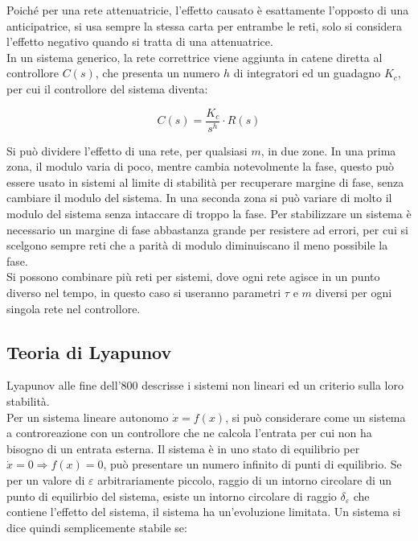 \documentclass{article}
\numberwithin{equation}{subsection}
\begin{document}
Poiché per una rete attenuatricie, l'effetto causato è esattamente l'opposto di una anticipatrice, si usa sempre la stessa carta per entrambe le reti, solo si considera 
l'effetto negativo quando si tratta di una attenuatrice. \\

In un sistema generico, la rete correttrice viene aggiunta in catene diretta al controllore $C(s)$, che presenta un numero $h$ di integratori ed un guadagno $K_c$, per cui 
il controllore del sistema diventa: 

\begin{equation}
    C(s)=\displaystyle\frac{K_c}{s^h}\cdot R(s)
\end{equation}

Si può dividere l'effetto di una rete, per qualsiasi $m$, in due zone. In una prima zona, il modulo varia di poco, mentre cambia notevolmente la fase, questo può essere 
usato in sistemi al limite di stabilità per recuperare margine di fase, senza cambiare il modulo del sistema. In una seconda zona si può variare di molto il modulo del 
sistema senza intaccare di troppo la fase. Per stabilizzare un sistema è necessario un margine di fase abbastanza grande per resistere ad errori, per cui si scelgono sempre 
reti che a parità di modulo diminuiscano il meno possibile la fase. \\


Si possono combinare più reti per sistemi, dove ogni rete agisce in un punto diverso nel tempo, in questo caso si useranno parametri $\tau$ e $m$ diversi per ogni singola 
rete nel controllore. 






\subsection{Teoria di Lyapunov}

Lyapunov alle fine dell'$800$ descrisse i sistemi non lineari ed un criterio sulla loro stabilità. \\

Per un sistema lineare autonomo $\dot x=f(x)$, si può considerare come un 
sistema a controreazione con un controllore che ne calcola l'entrata per cui non ha bisogno di un entrata esterna. Il sistema è in uno stato di equilibrio per 
$\dot x=0\Rightarrow f(x)=0$, può presentare un numero infinito di punti di equilibrio. Se per un valore di $\varepsilon$ arbitrariamente piccolo, raggio di un intorno 
circolare di un punto di equilirbio del sistema, esiste un intorno circolare di raggio $\delta_{\varepsilon}$ che contiene l'effetto del sistema, il sistema ha un'evoluzione 
limitata. Un sistema si dice quindi semplicemente stabile se:
\end{document}
